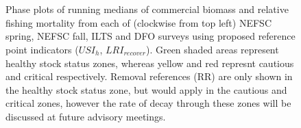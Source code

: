 \documentclass[11pt]{article}
\newcommand{\e}{/SpinDr/backup/bio_data/bio.lobster/figures/LFA3438Framework2019/} %
\begin{document}
\begin{landscape}
\begin{figure}
        \centering
                \\
                \\

\caption{Phase plots of running medians of commercial biomass and relative fishing mortality from each of (clockwise from top left) NEFSC spring, NEFSC fall, ILTS and DFO surveys using proposed reference point indicators ($USI_h$, $LRI_{recover}$). Green shaded areas represent healthy stock status zones, whereas yellow and red represnt cautious and critical respectively. Removal references (RR) are only shown in the healthy stock status zone, but would apply in the cautious and critical zones, however the rate of decay through these zones will be discussed at future advisory meetings.}
        \end{figure}


\end{landscape}
\end{document}
